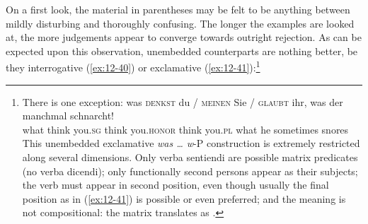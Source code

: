 \documentclass[output=paper]{langsci/langscibook}
\begin{document}
\addlines[2]
\enlargethispage{3pt}
On a first look, the material in parentheses may be felt to be
anything between mildly disturbing and thoroughly confusing. The
longer the examples are looked at, the more judgements appear to converge
towards outright rejection.  As can be expected upon this observation,
unembedded counterparts are nothing better, be they interrogative (\ref{ex:12-40})
or exclamative (\ref{ex:12-41}):\footnote{%
	There is one exception:
\ea
\label{ex:12-fn15i}
\gll
was \textsc{denkst} du / \textsc{meinen} Sie / \textsc{glaubt} ihr, was der manchmal schnarcht!\\   
          what think you.\textsc{sg} {} think you.\textsc{honor} {} think you.\textsc{pl} what he sometimes snores \\
   \z    
          This unembedded exclamative \textit{was \ldots{}  w}-P construction
          is extremely restricted along several dimensions. Only verba
          sentiendi are possible matrix predicates (no verba dicendi);
          only functionally second persons appear as their subjects;
          the verb must appear in second position, even though usually
          the final position as in (\ref{ex:12-41}) is possible or even preferred;
          and the meaning is not compositional: the matrix translates
          as .%
      }
\end{document}
